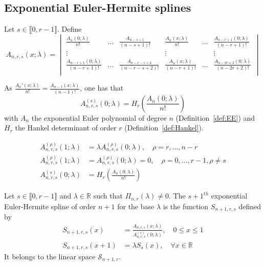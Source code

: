 \subsection{Exponential Euler-Hermite splines}

Let $s \in \llbracket0,r-1\rrbracket$. Define
\begin{equation}\label{eq:def-anrs}
  A_{n,r,s}(x;\lambda) = \begin{vmatrix}
    \frac{A_n(0;\lambda)}{n!} & \hdots & \frac{A_{n-s+1}}{(n-s+1)!} & \frac{A_n(x;\lambda)}{n!} & \hdots & 
    \frac{A_{n-r+1}(0;\lambda)}{(n-r+1)!} \\
    \vdots & & & \vdots & & \vdots \\
    \frac{A_{n-r+1}(0;\lambda)}{(n-r+1)!} & \hdots & \frac{A_{n-r-s+2}}{(n-r-s+2)!} & \frac{A_n(x;\lambda)}{(n-r+1)!} & 
    \hdots & \frac{A_{n-2r+2}(0;\lambda)}{(n-2r+2)!} \\
  \end{vmatrix}
\end{equation}

As $\frac{A_n'(x;\lambda)}{n!} = \frac{A_{n-1}(x;\lambda)}{(n-1)!}$, one has that 
\begin{equation}\label{eq:anrs}
  A^{(s)}_{n,r,s}(0; \lambda) = H_r\left(\frac{A_n(0;\lambda)}{n!}\right)
\end{equation}
with  $A_n$ the exponential Euler polynomial of degree $n$ (Definition~\ref{def:EE}) and $H_r$ the Hankel determinant of 
order $r$ (Definition~\ref{def:Hankel}).

\begin{prop}
  \begin{align*}
    A_{n,r,s}^{(\rho)}(1;\lambda) &= \lambda A_{n,r,s}^{(\rho)}(0;\lambda), \quad \rho=r, \ldots, n-r  \\
    A_{n,r,s}^{(\rho)}(1;\lambda) &= A_{n,r,s}^{(\rho)}(0;\lambda) = 0, \quad \rho=0, \ldots, r-1, \rho \neq s \\
    A_{n,r,s}^{(s)}(0;\lambda) &= H_r(\frac{A_n(0;\lambda)}{n!})
  \end{align*}
\end{prop}

\begin{deftn}\label{def:EEH}
  Let $s \in \llbracket0, r-1\rrbracket$ and $\lambda \in \mathbb{R}$ such that $\Pi_{n,r}(\lambda) \neq 0$. The 
  ${s+1}^{th}$ exponential Euler-Hermite spline of order $n+1$ for the base $\lambda$ is the function $S_{n+1,r,s}$ 
  defined by \begin{align}
    S_{n+1,r,s}(x) &= \frac{A_{n,r,s}(x; \lambda)}{A_{n,r,s}^{(s)}(0; \lambda)}, \quad 0 \leq x \leq 1 \\
    S_{n+1,r,s}(x+1) &= \lambda S_{s}(x), \quad \forall x \in \mathbb{R}
  \end{align}
  It belongs to the linear space $\mathscr{S}_{n+1,r}$.
\end{deftn}


